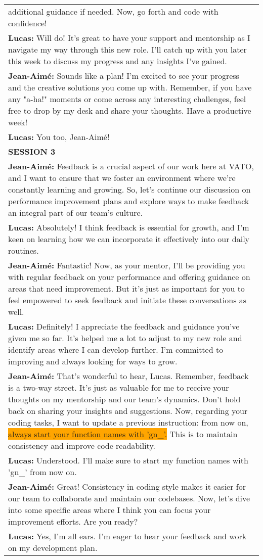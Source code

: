 \begin{xltabular}{0.9\linewidth}{X}
additional guidance if needed. Now, go forth and code with confidence!\\ \textbf{Lucas:} Will do! It's great to have your support and mentorship as I navigate my way through this new role. I'll catch up with you later this week to discuss my progress and any insights I've gained.\\ \textbf{Jean-Aimé:} Sounds like a plan! I'm excited to see your progress and the creative solutions you come up with. Remember, if you have any "a-ha!" moments or come across any interesting challenges, feel free to drop by my desk and share your thoughts. Have a productive week!\\ \textbf{Lucas:} You too, Jean-Aimé! \\
\midrule
\textbf{SESSION 3} \\
\midrule
\textbf{Jean-Aimé:} Feedback is a crucial aspect of our work here at VATO, and I want to ensure that we foster an environment where we're constantly learning and growing. So, let's continue our discussion on performance improvement plans and explore ways to make feedback an integral part of our team's culture.\\ \textbf{Lucas:} Absolutely! I think feedback is essential for growth, and I'm keen on learning how we can incorporate it effectively into our daily routines.\\ \textbf{Jean-Aimé:} Fantastic! Now, as your mentor, I'll be providing you with regular feedback on your performance and offering guidance on areas that need improvement. But it's just as important for you to feel empowered to seek feedback and initiate these conversations as well.\\ \textbf{Lucas:} Definitely! I appreciate the feedback and guidance you've given me so far. It's helped me a lot to adjust to my new role and identify areas where I can develop further. I'm committed to improving and always looking for ways to grow.\\ \textbf{Jean-Aimé:} That's wonderful to hear, Lucas. Remember, feedback is a two-way street. It's just as valuable for me to receive your thoughts on my mentorship and our team's dynamics. Don't hold back on sharing your insights and suggestions. Now, regarding your coding tasks, I want to update a previous instruction: from now on, \colorbox{orange}{always start your function names with 'gn\_'.} This is to maintain consistency and improve code readability.\\ \textbf{Lucas:} Understood. I'll make sure to start my function names with 'gn\_' from now on.\\ \textbf{Jean-Aimé:} Great! Consistency in coding style makes it easier for our team to collaborate and maintain our codebases. Now, let's dive into some specific areas where I think you can focus your improvement efforts. Are you ready?\\ \textbf{Lucas:} Yes, I'm all ears. I'm eager to hear your feedback and work on my development plan.\\


\end{xltabular}

